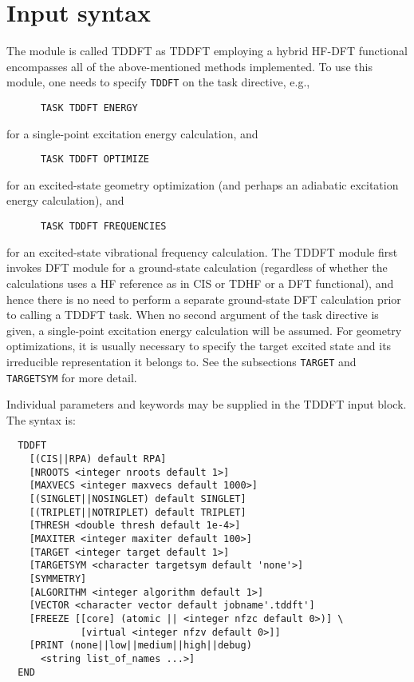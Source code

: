 \section{Input syntax}

The module is called TDDFT as TDDFT employing a hybrid HF-DFT functional 
encompasses all of the above-mentioned methods implemented.  To use this
module, one needs to specify \verb+TDDFT+ on the task directive, e.g.,
\begin{verbatim}
      TASK TDDFT ENERGY
\end{verbatim}
for a single-point excitation energy calculation, and
\begin{verbatim}
      TASK TDDFT OPTIMIZE
\end{verbatim}
for an excited-state geometry optimization (and perhaps an adiabatic
excitation energy calculation), and
\begin{verbatim}
      TASK TDDFT FREQUENCIES
\end{verbatim}
for an excited-state vibrational frequency calculation.  The TDDFT module
first invokes DFT module for a ground-state calculation (regardless of 
whether the calculations uses a HF reference as in CIS or TDHF or a DFT
functional), and hence there is no need to perform a separate ground-state
DFT calculation prior to calling a TDDFT task.  When no second argument
of the task directive is given, a single-point excitation energy calculation
will be assumed.  For geometry optimizations, it is usually necessary to
specify the target excited state and its irreducible representation it
belongs to.  See the subsections \verb+TARGET+ and \verb+TARGETSYM+ for
more detail.

Individual parameters and keywords may be supplied in the TDDFT input
block.  The syntax is:
\begin{verbatim}
  TDDFT
    [(CIS||RPA) default RPA]
    [NROOTS <integer nroots default 1>]
    [MAXVECS <integer maxvecs default 1000>]
    [(SINGLET||NOSINGLET) default SINGLET]
    [(TRIPLET||NOTRIPLET) default TRIPLET]
    [THRESH <double thresh default 1e-4>]
    [MAXITER <integer maxiter default 100>]
    [TARGET <integer target default 1>]
    [TARGETSYM <character targetsym default 'none'>]
    [SYMMETRY]
    [ALGORITHM <integer algorithm default 1>]
    [VECTOR <character vector default jobname'.tddft']
    [FREEZE [[core] (atomic || <integer nfzc default 0>)] \
             [virtual <integer nfzv default 0>]]
    [PRINT (none||low||medium||high||debug)
      <string list_of_names ...>]
  END
\end{verbatim}

